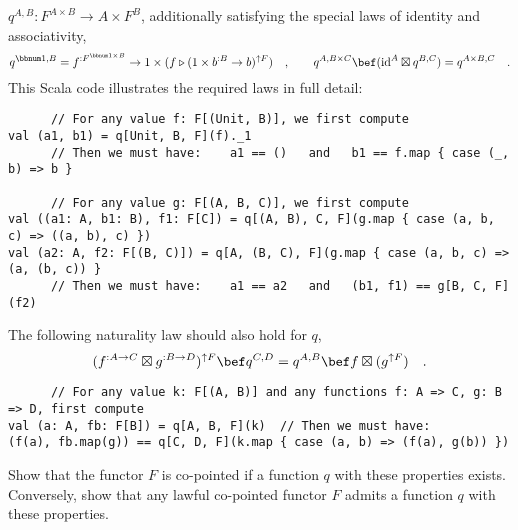 \noindent $q^{A,B}:F^{A\times B}\rightarrow A\times F^{B}$, additionally
satisfying the special laws of identity and associativity,
\[
q^{\bbnum 1,B}=f^{:F^{\bbnum 1\times B}}\rightarrow1\times(f\triangleright(1\times b^{:B}\rightarrow b)^{\uparrow F})\quad,\quad\quad q^{A,B\times C}\bef(\text{id}^{A}\boxtimes q^{B,C})=q^{A\times B,C}\quad.
\]
This Scala code illustrates the required laws in full detail:
\begin{lstlisting}
      // For any value f: F[(Unit, B)], we first compute
val (a1, b1) = q[Unit, B, F](f)._1
      // Then we must have:    a1 == ()   and   b1 == f.map { case (_, b) => b }

      // For any value g: F[(A, B, C)], we first compute
val ((a1: A, b1: B), f1: F[C]) = q[(A, B), C, F](g.map { case (a, b, c) => ((a, b), c) })
val (a2: A, f2: F[(B, C)]) = q[A, (B, C), F](g.map { case (a, b, c) => (a, (b, c)) }
      // Then we must have:    a1 == a2   and   (b1, f1) == g[B, C, F](f2)
\end{lstlisting}
The following naturality law should also hold for $q$,
\[
(f^{:A\rightarrow C}\boxtimes g^{:B\rightarrow D})^{\uparrow F}\bef q^{C,D}=q^{A,B}\bef f\boxtimes(g^{\uparrow F})\quad.
\]
\begin{lstlisting}
      // For any value k: F[(A, B)] and any functions f: A => C, g: B => D, first compute
val (a: A, fb: F[B]) = q[A, B, F](k)  // Then we must have:
(f(a), fb.map(g)) == q[C, D, F](k.map { case (a, b) => (f(a), g(b)) })
\end{lstlisting}
Show that the functor $F$ is co-pointed if a function $q$ with these
properties exists. Conversely, show that any lawful co-pointed functor
$F$ admits a function $q$ with these properties.

